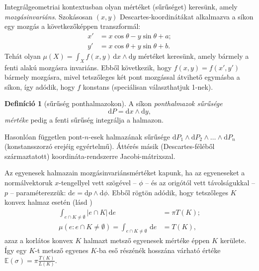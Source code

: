 \documentclass[DIV=15,appendixprefix]{scrreprt}
\theoremstyle{definition}
\newtheorem*{defin}{Definíció}
\theoremstyle{remark}
\newcommand{\mean}{\mathbb{E}}
\begin{document}
Integrálgeometriai kontextusban olyan mértéket (sűrűséget) keresünk, amely \emph{mozgásinvariáns}.
Szokásosan $ \left( x,{} y \right) $ Descartes-koordinátákat alkalmazva a síkon egy mozgás a
következőképpen transzformál:
\begin{align*}
	x' &= x \cos \theta - y \sin \theta + a;\\
	y' &= x \cos \theta + y \sin \theta + b.
\end{align*}
Tehát olyan $ \mu \left( X \right) = \int_{ X } f \left( x,{} y \right) \, \mathrm{ d }x \wedge
\mathrm{ d } y $ mértéket keresünk, amely bármely a fenti alakú mozgásra invariáns. Ebből
következik, hogy $ f \left(
x,{} y \right) = f \left( x',{} y' \right) $ bármely mozgásra, mivel tetszőleges két pont mozgással
átvihető egymásba a síkon, így adódik, hogy $ f $ konstans (speciálisan választhatjuk 1-nek).
\begin{defin}[sűrűség ponthalmazokon]
	A síkon \emph{ponthalmazok sűrűsége}
	\begin{equation*}
		\mathrm{ d } P =  \mathrm{ d }x \wedge \mathrm{ d } y,
	\end{equation*}
	\emph{mértéke} pedig a fenti sűrűség integrálja a halmazon.
\end{defin}
Hasonlóan független pont-$ n $-esek halmazának sűrűsége $ \mathrm{ d } P_{ 1 } \wedge \mathrm{ d }
P_{ 2 } \wedge \ldots \wedge \mathrm{ d } P_{ n } $ (konstansszorzó erejéig egyértelmű). Áttérés
másik (Descartes-féléből származtatott) koordináta-rendszerre Jacobi-mátrixszal.

Az egyenesek halmazain mozgásinvariánsmértéket kapunk, ha az egyeneseket a
normálvektoruk $ x $-tengellyel vett szögével -- $ \phi $ -- és az origótól vett távolságukkal
-- $ p $ -- paraméterezzük: $ \mathrm{ d } e =  \mathrm{ d }p \wedge \mathrm{ d } \phi $. Ebből
rögtön adódik, hogy tetszőleges $ K $ konvex halmaz esetén (lásd \cite[29--30.~oldal]{Santalo})
\begin{align*}
	\int_{ e \cap K \neq \emptyset } \left| e \cap K \right| \, \mathrm{ d } e &= \pi T \left( K
	\right);\\
	\mu \left( e \colon e \cap K \neq \emptyset \right) = \int_{ e \cap K \neq \emptyset } \,
	\mathrm{ d } e &= T \left( K \right),
\end{align*}
azaz a korlátos konvex $ K $ halmazt metsző egyenesek mértéke éppen $ K $ kerülete. Így egy $ K $-t
metsző egyenes $ K $-ba eső részénék hosszána várható értéke $ \mean \left( \sigma \right)  = \pi
\frac{ T \left( K \right) }{ L \left( K  \right) } $.
\end{document}
